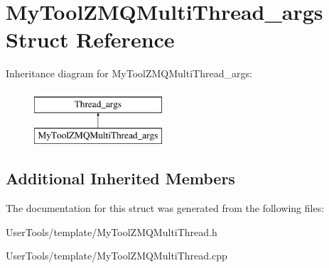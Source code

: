 \hypertarget{structMyToolZMQMultiThread__args}{\section{My\-Tool\-Z\-M\-Q\-Multi\-Thread\-\_\-args Struct Reference}
\label{structMyToolZMQMultiThread__args}
}
Inheritance diagram for My\-Tool\-Z\-M\-Q\-Multi\-Thread\-\_\-args\-:\begin{figure}[H]
\begin{center}
\leavevmode
\includegraphics[height=2.000000cm]{structMyToolZMQMultiThread__args}
\end{center}
\end{figure}
\subsection*{Additional Inherited Members}


The documentation for this struct was generated from the following files\-:\begin{DoxyCompactItemize}
\item 
User\-Tools/template/My\-Tool\-Z\-M\-Q\-Multi\-Thread.\-h\item 
User\-Tools/template/My\-Tool\-Z\-M\-Q\-Multi\-Thread.\-cpp\end{DoxyCompactItemize}
